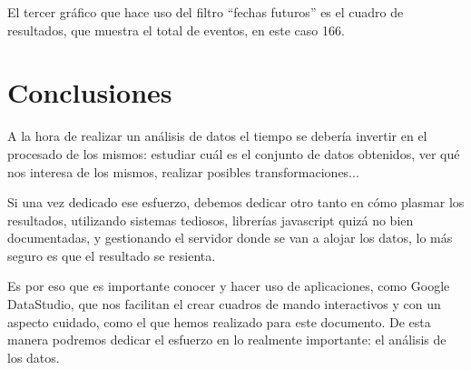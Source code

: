 \documentclass{\ClassPath/viu-tfm-template}
\begin{document}
El tercer gráfico que hace uso del filtro “fechas futuros” es el cuadro de resultados, que muestra el total de eventos, en este caso 166.


\chapter{Conclusiones}

A la hora de realizar un análisis de datos el tiempo se debería invertir en el procesado de los mismos: estudiar cuál es el conjunto de datos obtenidos, ver qué nos interesa de los mismos, realizar posibles transformaciones...

Si una vez dedicado ese esfuerzo, debemos dedicar otro tanto en cómo plasmar los resultados, utilizando sistemas tediosos, librerías javascript quizá no bien documentadas, y gestionando el servidor donde se van a alojar los datos, lo más seguro es que el resultado se resienta.

Es por eso que es importante conocer y hacer uso de aplicaciones, como Google DataStudio, que nos facilitan el crear cuadros de mando interactivos y con un aspecto cuidado, como el que hemos realizado para este documento. De esta manera   podremos dedicar el esfuerzo en lo realmente importante: el análisis de los datos.
\end{document}
